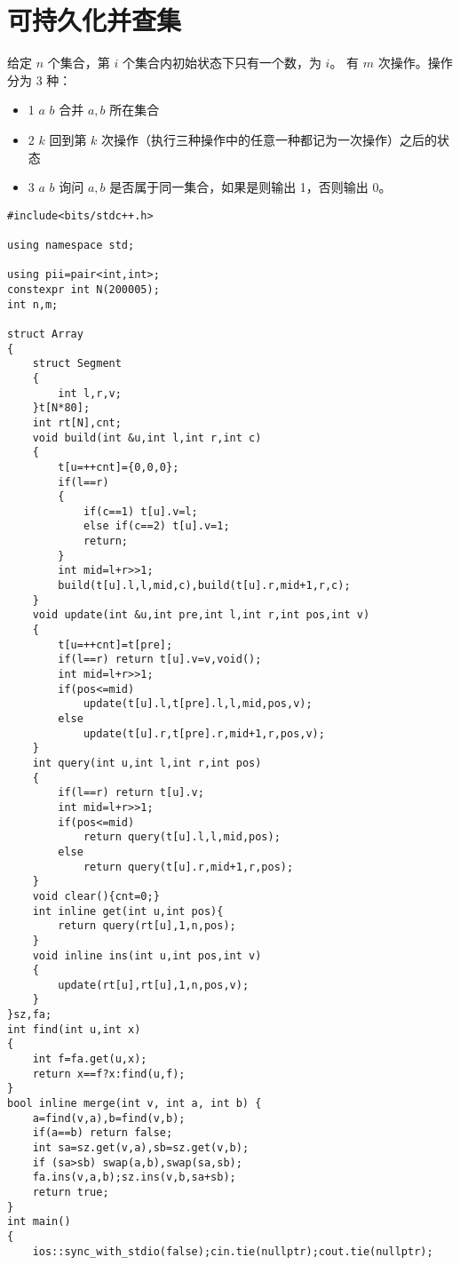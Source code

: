 \section{可持久化并查集}
\begin{tcolorbox}
给定 $n$ 个集合，第 $i$ 个集合内初始状态下只有一个数，为 $i$。
有 $m$ 次操作。操作分为 3 种：
\begin{itemize}
\item 1 $a$ $b$ 合并 $a,b$ 所在集合
\item 2 $k$ 回到第 $k$ 次操作（执行三种操作中的任意一种都记为一次操作）之后的状态
\item 3 $a$ $b$ 询问 $a,b$ 是否属于同一集合，如果是则输出 1，否则输出 0。

\end{itemize}
\end{tcolorbox}
\begin{verbatim}
#include<bits/stdc++.h>

using namespace std;

using pii=pair<int,int>;
constexpr int N(200005);
int n,m;

struct Array
{
    struct Segment
    {
        int l,r,v;
    }t[N*80];
    int rt[N],cnt;
    void build(int &u,int l,int r,int c)
    {
        t[u=++cnt]={0,0,0};
        if(l==r) 
        {
            if(c==1) t[u].v=l;
            else if(c==2) t[u].v=1;
            return;
        }
        int mid=l+r>>1;
        build(t[u].l,l,mid,c),build(t[u].r,mid+1,r,c);
    }
    void update(int &u,int pre,int l,int r,int pos,int v)
    {
        t[u=++cnt]=t[pre];
        if(l==r) return t[u].v=v,void();
        int mid=l+r>>1;
        if(pos<=mid) 
            update(t[u].l,t[pre].l,l,mid,pos,v);
        else
            update(t[u].r,t[pre].r,mid+1,r,pos,v);
    }
    int query(int u,int l,int r,int pos)
    {
        if(l==r) return t[u].v;
        int mid=l+r>>1;
        if(pos<=mid) 
            return query(t[u].l,l,mid,pos);
        else
            return query(t[u].r,mid+1,r,pos);
    }
    void clear(){cnt=0;}
    int inline get(int u,int pos){
        return query(rt[u],1,n,pos);
    }
    void inline ins(int u,int pos,int v)
    {
        update(rt[u],rt[u],1,n,pos,v);
    }
}sz,fa;
int find(int u,int x)
{
    int f=fa.get(u,x);
    return x==f?x:find(u,f);
}
bool inline merge(int v, int a, int b) {
    a=find(v,a),b=find(v,b);
    if(a==b) return false;
    int sa=sz.get(v,a),sb=sz.get(v,b);
    if (sa>sb) swap(a,b),swap(sa,sb);
    fa.ins(v,a,b);sz.ins(v,b,sa+sb);
    return true;
}
int main()
{
    ios::sync_with_stdio(false);cin.tie(nullptr);cout.tie(nullptr);


\end{verbatim}
